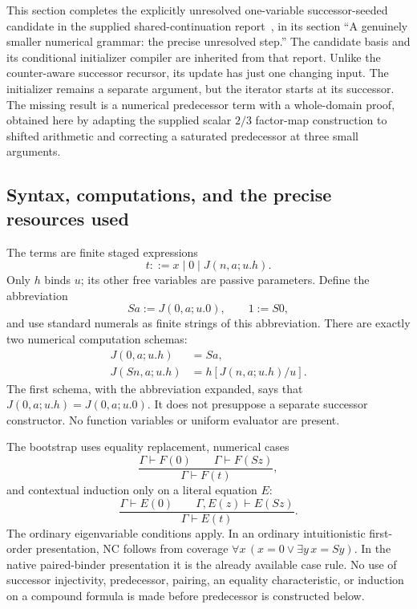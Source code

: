 \documentclass[11pt]{article}
\theoremstyle{definition}
\begin{document}
This section completes the explicitly unresolved one-variable
successor-seeded candidate in the supplied shared-continuation
report~\cite{shared}, in its section ``A genuinely smaller numerical
grammar: the precise unresolved step.''  The candidate basis and its
conditional initializer compiler are inherited from that report.
Unlike the counter-aware successor recursor, its update has just one
changing input.  The initializer remains a separate argument, but the
iterator starts at its successor.  The missing result is a numerical
predecessor term with a whole-domain proof, obtained here by adapting
the supplied scalar $2/3$ factor-map construction to shifted arithmetic
and correcting a saturated predecessor at three small arguments.

\subsection{Syntax, computations, and the precise resources used}

The terms are finite staged expressions
\[
 t ::= x\mid 0\mid J(n,a;u.h).
\]
Only $h$ binds $u$; its other free variables are passive parameters.
Define the abbreviation
\[
 Sa:=J(0,a;u.0),\qquad 1:=S0,
\]
and use standard numerals as finite strings of this abbreviation.
There are exactly two numerical computation schemas:
\begin{align}
 J(0,a;u.h)&=Sa,\tag{J0}\label{js:j0}\\
 J(Sn,a;u.h)&=h[J(n,a;u.h)/u].\tag{JS}\label{js:js}
\end{align}
The first schema, with the abbreviation expanded, says that
$J(0,a;u.h)=J(0,a;u.0)$.  It does not presuppose a separate successor
constructor.  No function variables or uniform evaluator are present.

The bootstrap uses equality replacement, numerical cases
\[
 \frac{\Gamma\vdash F(0)\qquad\Gamma\vdash F(Sz)}
      {\Gamma\vdash F(t)},
 \tag{NC}\label{js:nc}
\]
and contextual induction only on a literal equation $E$:
\[
 \frac{\Gamma\vdash E(0)\qquad\Gamma,E(z)\vdash E(Sz)}
      {\Gamma\vdash E(t)}.
 \tag{EI}\label{js:ei}
\]
The ordinary eigenvariable conditions apply.  In an ordinary
intuitionistic first-order presentation, NC follows from coverage
$\forall x\,(x=0\vee\exists y\,x=Sy)$.  In the native paired-binder
presentation it is the already available case rule.  No use of
successor injectivity, predecessor, pairing, an equality characteristic,
or induction on a compound formula is made before predecessor is
constructed below.
\end{document}
